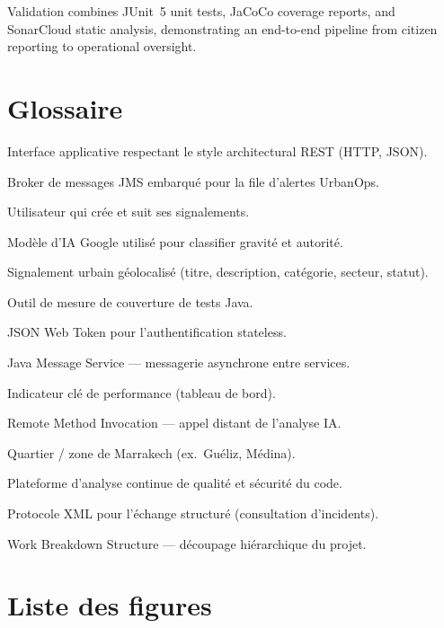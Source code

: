 \documentclass[12pt,a4paper,oneside]{report}
\begin{document}
Validation combines JUnit~5 unit tests, JaCoCo coverage reports, and SonarCloud static analysis, demonstrating an end-to-end pipeline from citizen reporting to operational oversight.

\newpage

\chapter*{Glossaire}
\begin{description}[style=nextline, leftmargin=3.2cm, labelwidth=3cm, font=\normalfont]
  \item[API REST] Interface applicative respectant le style architectural REST (HTTP, JSON).
  \item[Artemis] Broker de messages JMS embarqué pour la file d'alertes UrbanOps.
  \item[Citoyen (CITIZEN)] Utilisateur qui crée et suit ses signalements.
  \item[Gemini] Modèle d'IA Google utilisé pour classifier gravité et autorité.
  \item[Incident] Signalement urbain géolocalisé (titre, description, catégorie, secteur, statut).
  \item[JaCoCo] Outil de mesure de couverture de tests Java.
  \item[JWT] JSON Web Token pour l'authentification stateless.
  \item[JMS] Java Message Service — messagerie asynchrone entre services.
  \item[KPI] Indicateur clé de performance (tableau de bord).
  \item[RMI] Remote Method Invocation — appel distant de l'analyse IA.
  \item[Sector] Quartier / zone de Marrakech (ex.\ Guéliz, Médina).
  \item[SonarCloud] Plateforme d'analyse continue de qualité et sécurité du code.
  \item[SOAP] Protocole XML pour l'échange structuré (consultation d'incidents).
  \item[WBS] Work Breakdown Structure — découpage hiérarchique du projet.
\end{description}

\newpage

\chapter*{Liste des figures}
\listoffigures
\newpage
\end{document}
